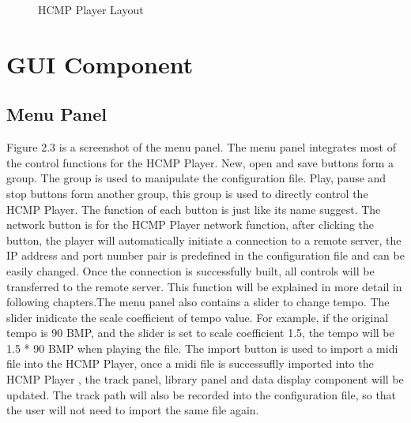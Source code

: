 \begin{figure}[H]
\caption{HCMP Player Layout}
\label{fig:speciation}
\end{figure}

\section{GUI Component}

\subsection{Menu Panel}

Figure 2.3 is a screenshot of the menu panel. The menu panel integrates most of the control 
functions for the HCMP Player. New, open and save buttons form a group. The group is used to 
manipulate the configuration file. Play, pause and stop buttons form another group, 
this group is used to directly control the HCMP Player. 
The function of each button is just like its name suggest. The network button 
is for the HCMP Player  
network function, after clicking the button, the player will automatically 
initiate a connection to a remote server, the IP address and port number pair is 
predefined in the configuration file and can be easily changed. Once the connection is 
successfully built, all controls will be transferred to the remote server. 
This function will be explained in more detail in following
chapters.The menu panel also contains a slider to change 
tempo. The slider inidicate the scale coefficient of tempo value. For example, 
if the original tempo is 90 BMP, and the slider is set to scale coefficient 1.5, 
the tempo will be 1.5 * 90 
BMP when playing the file. The import button is used to import a midi file 
into the HCMP Player, once a midi file is successuflly imported into the HCMP Player  
, the track panel, library panel and data display component will be updated. 
The track path will also be recorded into the configuration file, so that the user 
will not need to import the same file again.

